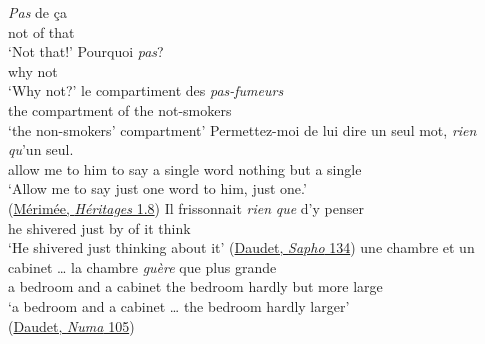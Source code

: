 \ea \label{ex:03-01}
\ea
\gll \textit{Pas} de ça\\
 not of that\\
\glt `Not that!' 
\ex
\gll Pourquoi \textit{pas}?\\
 why not\\
\glt `Why not?'
\ex
\gll le compartiment des \textit{pas-fumeurs}\\
 the compartment {of the} not-smokers\\
\glt `the non-smokers' compartment' 
\ex
{}\gll Permettez-moi de lui dire un seul mot, \textit{rien} \textit{qu}'un seul.\\
 {allow me} to him {to say} a single word nothing {but a} single\\
\glt `Allow me to say just one word to him, just one.'\\\hfill(\href{https://archive.org/details/lesdeuxhritages02gogogoog/page/n39/mode/2up?q=%22Permettez-moi+de+lui+dire+un+seul+mot%22&view=theater}{Mérimée, \textit{Héritages} 1.8})
\ex
\gll Il frissonnait \textit{rien} \textit{que} d'y penser\\
 he shivered just by {of it} think\\
\glt `He shivered just thinking about it'
\hfill(\href{https://archive.org/details/saphomursparisi00daudgoog/page/n145/mode/2up?q=%22frissonnait+rien+que+d%27y+penser%22&view=theater}{Daudet, \textit{Sapho} 134})
\ex{}
\gll une chambre et un cabinet {\dots} la chambre \textit{guère} que plus grande\\
 a bedroom and a cabinet {} the bedroom hardly but more large\\
\glt `a bedroom and a cabinet {\dots} the bedroom hardly larger'\\\hfill(\href{https://archive.org/details/numaroumestanmo00daud/page/130/mode/2up?q=%22la+chambre+gu%C3%A8re+plus+grande%22&view=theater}{Daudet, \textit{Numa} 105})
\z
\z

